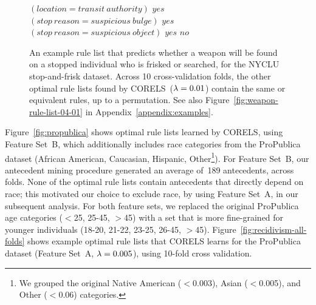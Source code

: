 %
\begin{figure}[ht!]
\vspace{2mm}
\begin{algorithmic}
\State \bif $(location = transit~authority)$ \bthen $yes$
\State \belif $(stop~reason = suspicious~bulge)$ \bthen $yes$
\State \belif $(stop~reason = suspicious~object)$ \bthen $yes$
\State \belse $no$
\end{algorithmic}
\caption{An example rule list that predicts whether a weapon will be found on a
stopped individual who is frisked or searched, for the NYCLU stop-and-frisk dataset.
%
Across 10 cross-validation folds, the other optimal rule lists found by CORELS~(${{\lambda} = 0.01}$)
contain the same or equivalent rules, up to a permutation.
%
See also Figure~\ref{fig:weapon-rule-list-04-01} in Appendix~\ref{appendix:examples}.
}
\label{fig:weapon-rule-list}
\end{figure}

Figure~\ref{fig:propublica} shows optimal rule lists learned by CORELS,
using Feature Set~B, which additionally includes race categories from the ProPublica dataset (African American, Caucasian, Hispanic,
Other\footnote{We grouped the original Native American ($<$0.003), Asian ($<$0.005), and Other ($<$0.06) categories.}).
%
For Feature Set~B, our antecedent mining procedure generated an average
of~189 antecedents, across folds.
%
None of the optimal rule lists contain antecedents that directly depend on race;
this motivated our choice to exclude race, by using Feature Set~A, in our subsequent analysis.
%
For both feature sets, we replaced the original ProPublica age categories ($<$25, 25-45, $>$45)
with a set that is more fine-grained for younger individuals (18-20, 21-22, 23-25, 26-45, $>$45).
%
Figure~\ref{fig:recidivism-all-folds} shows example optimal rule lists that CORELS learns
for the ProPublica dataset (Feature Set~A, ${{\lambda} = 0.005}$), using 10-fold cross validation.

